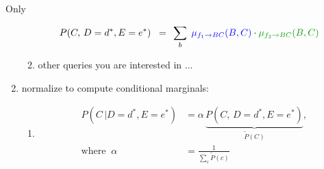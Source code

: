 \begin{frame}{Only}
\begin{enumerate}
\begin{enumerate}
\begin{align}
					P(C, \,D = d^*, E = e^*) 
						\;\; =& \;\; \sum_{b}{} \;
							{\color{blue}\mu_{f_1 \to BC}(B,C)} \cdot 
							{\color{darkgreen} \mu_{f_2 \to BC}(B,C)} 
		\end{align}
  \item other queries you are interested in $\ldots$
  \end{enumerate}
  \item<only@11> normalize to compute conditional marginals:
  \begin{enumerate}
  \item[]
  \slidesonly{\vspace{-3mm}}
   \begin{align}
            P(C\, | D = d^*, E = e^*) &= \alpha \, \underbrace{P(C, \,D = d^*, E = e^*)}_{\tilde P(C)},\\
            \text{where} \;\; \alpha &= \frac{1}{\sum_c \tilde P(c)}
		\end{align}
  \end{enumerate}
  
\end{enumerate}
 \endgroup
\end{frame}



